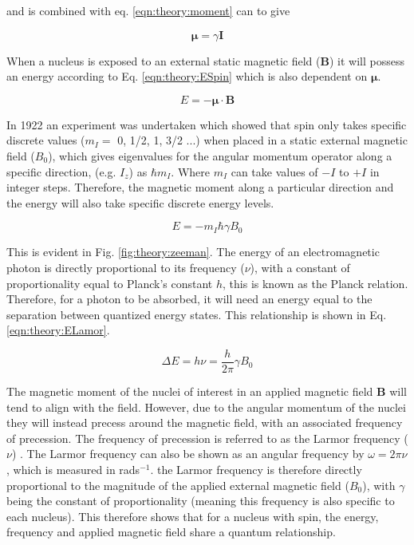  \noindent and is combined with eq. \ref{eqn:theory:moment} can to give

\begin{equation}
    \boldsymbol{\mu} = \gamma \mathbf{I}
    \label{eqn:theory:moment_gyro}
\end{equation}

When a nucleus is exposed to an external static magnetic field ($\mathbf{B}$) it will possess an energy according to Eq. \ref{eqn:theory:ESpin} which is also dependent on $\boldsymbol\mu$.

\begin{equation}
    E = - \boldsymbol\mu \cdot \mathbf{B}
\end{equation}

In 1922 an experiment was undertaken \cite{Gerlach1922DerMagnetfeld} which showed that spin only takes specific discrete values ($m_I =$ 0, 1/2, 1, 3/2 ...) when placed in a static external magnetic field ($B_0$), which gives eigenvalues for the angular momentum operator along a specific direction, (e.g. $I_z$) as $\hbar m_I$. Where $m_I$ can take values of $-I$ to $+I$ in integer steps. Therefore, the magnetic moment along a particular direction and the energy will also take specific discrete energy levels.

\begin{equation}
    E = -m_I\hbar \gamma B_0
    \label{eqn:theory:ESpin}
\end{equation}

This is evident in Fig. \ref{fig:theory:zeeman}. The energy of an electromagnetic photon is directly proportional to its frequency ($\nu$), with a constant of proportionality equal to Planck's constant $h$, this is known as the Planck relation. Therefore, for a photon to be absorbed, it will need an energy equal to the separation between quantized energy states. This relationship is shown in Eq. \ref{eqn:theory:ELamor}.

\begin{equation}
    \Delta E = h\nu = \frac{h}{2\pi}\gamma B_0
    \label{eqn:theory:ELamor}
\end{equation}  

The magnetic moment of the nuclei of interest in an applied magnetic field $\mathbf{B}$ will tend to align with the field. However, due to the angular momentum of the nuclei they will instead precess around the magnetic field, with an associated frequency of precession. The frequency of precession is referred to as the Larmor frequency ($\nu$) \cite{Larmor1897LXIII.Ions}. The Larmor frequency can also be shown as an angular frequency by $\omega=2\pi \nu$, which is measured in rads$^{-1}$. the Larmor frequency is therefore directly proportional to the magnitude of the applied external magnetic field ($B_0$), with $\gamma$ being the constant of proportionality (meaning this frequency is also specific to each nucleus). This therefore shows that for a nucleus with spin, the energy, frequency and applied magnetic field share a quantum relationship. 

